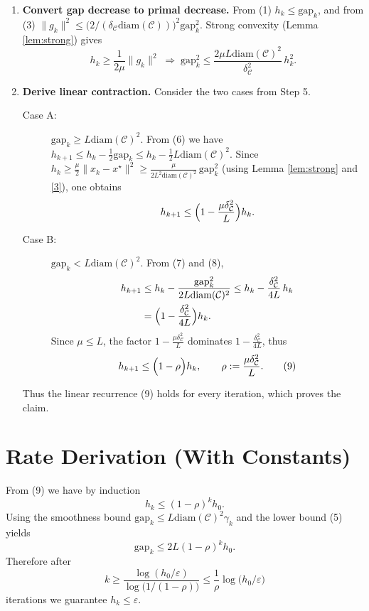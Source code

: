 \documentclass{article}
\newcommand{\C}{\mathcal{C}}
\newcommand{\gap}{\mathrm{gap}}
\newcommand{\diam}{\mathrm{diam}}
\begin{document}
\begin{enumerate}[label=[Step \arabic*],leftmargin=*]
\item \textbf{Convert gap decrease to primal decrease.}  
From (1) $h_{k}\le\gap_{k}$, and from (3) $\|g_{k}\|^{2}\le\bigl(2/(\delta_{\C}\diam(\C))\bigr)^{2}\gap_{k}^{2}$.
Strong convexity (Lemma \ref{lem:strong}) gives
\[
h_{k}\ge \frac{1}{2\mu}\|g_{k}\|^{2}
\;\Longrightarrow\;
\gap_{k}^{2}\le \frac{2\mu L\diam(\C)^{2}}{\delta_{\C}^{2}}\,h_{k}^{2}.
\tag{8}
\]

\item \textbf{Derive linear contraction.}  
Consider the two cases from Step 5.

\begin{description}
\item[Case A:] $\gap_{k}\ge L\diam(\C)^{2}$.  
From (6) we have $h_{k+1}\le h_{k}-\frac12\gap_{k}\le h_{k}-\frac12 L\diam(\C)^{2}$.
Since $h_{k}\ge\frac{\mu}{2}\|x_{k}-x^{\star}\|^{2}\ge\frac{\mu}{2L^{2}\diam(\C)^{2}}\,\gap_{k}^{2}$ (using Lemma \ref{lem:strong} and \eqref{3}), one obtains
\[
h_{k+1}\le\Bigl(1-\frac{\mu\delta_{\C}^{2}}{L}\Bigr)h_{k}.
\]

\item[Case B:] $\gap_{k}< L\diam(\C)^{2}$.  
From (7) and (8),
\[
\begin{aligned}
h_{k+1}
&\le h_{k}-\frac{\gap_{k}^{2}}{2L\diam(\C)^{2}}
\le h_{k}-\frac{\delta_{\C}^{2}}{4L}\,h_{k}\\
&= \Bigl(1-\frac{\delta_{\C}^{2}}{4L}\Bigr)h_{k}.
\end{aligned}
\]
Since $\mu\le L$, the factor $1-\frac{\mu\delta_{\C}^{2}}{L}$ dominates $1-\frac{\delta_{\C}^{2}}{4L}$, thus
\[
h_{k+1}\le\Bigl(1-\rho\Bigr)h_{k},
\qquad\rho:=\frac{\mu\delta_{\C}^{2}}{L}.
\tag{9}
\]
\end{description}
Thus the linear recurrence (9) holds for every iteration, which proves the claim.
\end{enumerate}

\section*{Rate Derivation (With Constants)}
From (9) we have by induction
\[
h_{k}\le(1-\rho)^{k}h_{0}.
\]
Using the smoothness bound $\gap_{k}\le L\diam(\C)^{2}\gamma_{k}$ and the lower bound (5) yields
\[
\gap_{k}\le 2L(1-\rho)^{k}h_{0}.
\]
Therefore after
\[
k\ge \frac{\log(h_{0}/\varepsilon)}{\log\bigl(1/(1-\rho)\bigr)}
\le \frac{1}{\rho}\log\!\bigl(h_{0}/\varepsilon\bigr)
\]
iterations we guarantee $h_{k}\le\varepsilon$.
\end{document}
